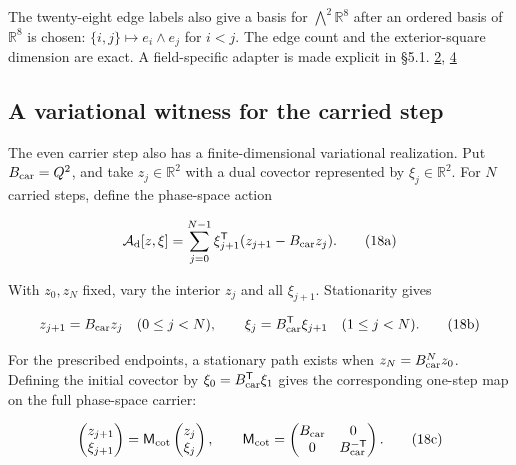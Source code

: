 The twenty-eight edge labels also give a basis for \(\bigwedge^2\mathbb R^8\) after an ordered basis of \(\mathbb R^8\) is chosen: \(\{i,j\}\mapsto e_i\wedge e_j\) for \(i<j\). The edge count and the exterior-square dimension are exact. A field-specific adapter is made explicit in §5.1. \href{https://doi.org/10.5281/zenodo.23697265}{2}, \href{https://github.com/Coppalini-Architecture/coppalini-architecture/blob/9b7122ca5c3712c2c294e2bc5097276d0ba9817b/papers/motion-and-difference/motion-and-difference-2026-07-17.pdf}{4}

\hypertarget{a-variational-witness-for-the-carried-step}{%
\subsection{A variational witness for the carried step}\label{a-variational-witness-for-the-carried-step}}

The even carrier step also has a finite-dimensional variational realization. Put \(B_{\rm car}=Q^2\), and take \(z_j\in\mathbb R^2\) with a dual covector represented by \(\xi_j\in\mathbb R^2\). For \(N\) carried steps, define the phase-space action

\[
\mathcal A_{\rm d}[z,\xi]
=\sum_{j=0}^{N-1}
\xi_{j+1}^{\mathsf T}(z_{j+1}-B_{\rm car}z_j).
\tag{18a}
\]

With \(z_0,z_N\) fixed, vary the interior \(z_j\) and all \(\xi_{j+1}\). Stationarity gives

\[
z_{j+1}=B_{\rm car}z_j\quad(0\leq j<N),\qquad
\xi_j=B_{\rm car}^{\mathsf T}\xi_{j+1}\quad(1\leq j<N).
\tag{18b}
\]

For the prescribed endpoints, a stationary path exists when \(z_N=B_{\rm car}^{N}z_0\). Defining the initial covector by \(\xi_0=B_{\rm car}^{\mathsf T}\xi_1\) gives the corresponding one-step map on the full phase-space carrier:

\[
\begin{pmatrix}z_{j+1}\\ \xi_{j+1}\end{pmatrix}
=
\mathsf M_{\rm cot}
\begin{pmatrix}z_j\\ \xi_j\end{pmatrix},
\qquad
\mathsf M_{\rm cot}
=\begin{pmatrix}B_{\rm car}&0\\0&B_{\rm car}^{-\mathsf T}\end{pmatrix}.
\tag{18c}
\]


